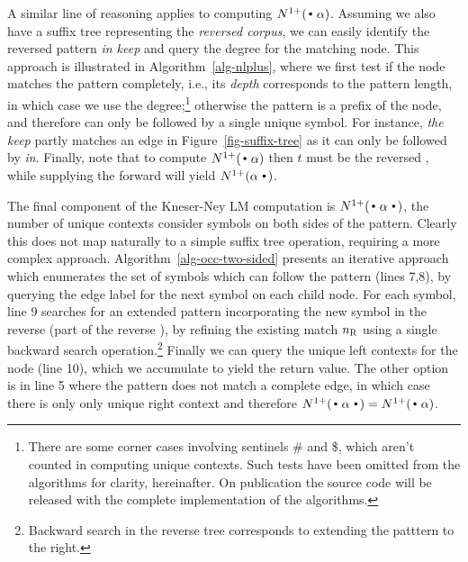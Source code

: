 A similar line of reasoning applies to computing
$\nlplus{\dotpat}$. Assuming we also have a suffix tree representing
the \emph{reversed corpus}, we can easily identify the reversed pattern
\emph{in keep} and query the degree for the matching node. This
approach is illustrated in Algorithm~\ref{alg-nlplus}, where we first
test if the node matches the pattern completely, i.e., its
\emph{depth} corresponds to the pattern length, in which case we use
the degree;\footnote{There are some corner cases involving sentinels \#
  and \$, which aren't counted in computing unique contexts.
  Such tests have been omitted from the algorithms for clarity, hereinafter. On publication the
  source code will be released with the complete implementation of the
  algorithms.}
otherwise the pattern is a prefix of the node, and
therefore can only be followed by a single unique symbol. 
For instance, \emph{the keep} partly matches an edge in
Figure~\ref{fig-suffix-tree} as it can only be followed by \emph{in}.
Finally, note that to compute $\nlplus{\dotpat}$ then $t$ must be the reversed \CST,
while supplying the forward \CST will yield $\nlplus{\patdot}$. 

The final component of the Kneser-Ney LM computation is
$\nlplus{\dotpatdot}$, the number of unique contexts consider symbols
on both sides of the pattern. 
Clearly this does not map naturally to a simple suffix tree operation,
requiring a more complex approach.
Algorithm~\ref{alg-occ-two-sided} presents an iterative approach 
which enumerates the set of symbols which can follow the pattern
(lines 7,8), by querying the edge label for the next symbol on each
child node.
For each symbol, line 9 searches for an extended pattern incorporating
the new symbol in the reverse \CSA (part of the reverse \CST), by refining the existing match
$n_{\text{R}}$ using a single backward search operation.\footnote{Backward 
search in the reverse tree corresponds to extending the patttern to the right.}
Finally we can query the unique left contexts for the node (line 10),
which we accumulate to yield the return value.
The other option is in line 5 where the pattern does not match a
complete edge, in which case there is only only unique right context
and therefore $\nlplus{\dotpatdot} = \nlplus{\dotpat}$.

